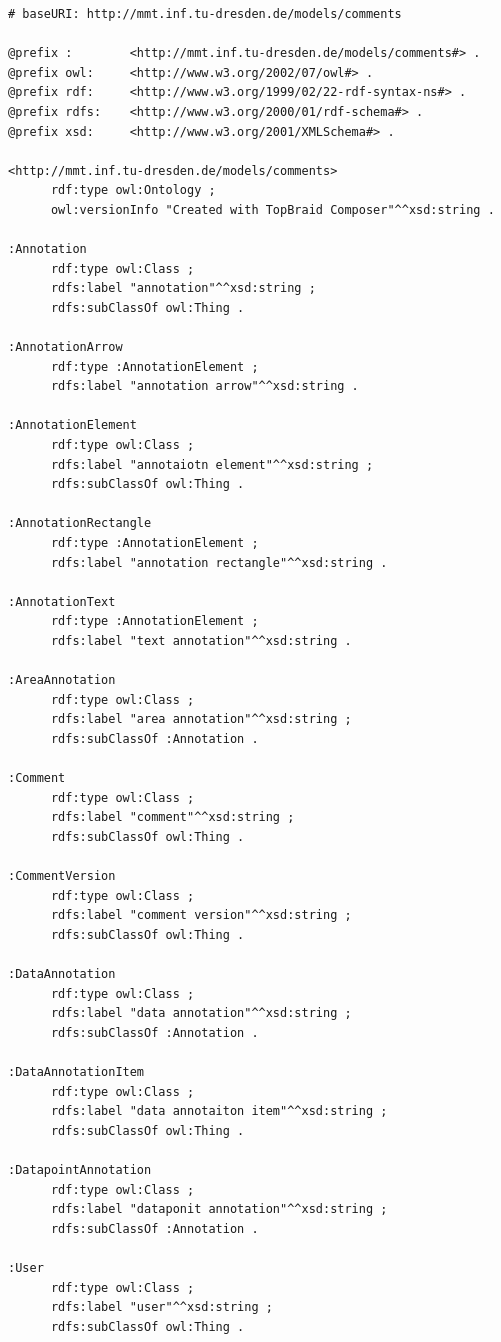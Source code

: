 \documentclass[
	headsepline,
	footsepline,
	fontsize=12pt,
	bibliography=totoc
]{scrbook}
\begin{document}
\begin{lstlisting}[caption={RDF Format eines Kommentars in Turtle}, label=code:implementierung-format-rdf]
# baseURI: http://mmt.inf.tu-dresden.de/models/comments

@prefix :        <http://mmt.inf.tu-dresden.de/models/comments#> .
@prefix owl:     <http://www.w3.org/2002/07/owl#> .
@prefix rdf:     <http://www.w3.org/1999/02/22-rdf-syntax-ns#> .
@prefix rdfs:    <http://www.w3.org/2000/01/rdf-schema#> .
@prefix xsd:     <http://www.w3.org/2001/XMLSchema#> .

<http://mmt.inf.tu-dresden.de/models/comments>
      rdf:type owl:Ontology ;
      owl:versionInfo "Created with TopBraid Composer"^^xsd:string .

:Annotation
      rdf:type owl:Class ;
      rdfs:label "annotation"^^xsd:string ;
      rdfs:subClassOf owl:Thing .

:AnnotationArrow
      rdf:type :AnnotationElement ;
      rdfs:label "annotation arrow"^^xsd:string .

:AnnotationElement
      rdf:type owl:Class ;
      rdfs:label "annotaiotn element"^^xsd:string ;
      rdfs:subClassOf owl:Thing .

:AnnotationRectangle
      rdf:type :AnnotationElement ;
      rdfs:label "annotation rectangle"^^xsd:string .

:AnnotationText
      rdf:type :AnnotationElement ;
      rdfs:label "text annotation"^^xsd:string .

:AreaAnnotation
      rdf:type owl:Class ;
      rdfs:label "area annotation"^^xsd:string ;
      rdfs:subClassOf :Annotation .

:Comment
      rdf:type owl:Class ;
      rdfs:label "comment"^^xsd:string ;
      rdfs:subClassOf owl:Thing .

:CommentVersion
      rdf:type owl:Class ;
      rdfs:label "comment version"^^xsd:string ;
      rdfs:subClassOf owl:Thing .

:DataAnnotation
      rdf:type owl:Class ;
      rdfs:label "data annotation"^^xsd:string ;
      rdfs:subClassOf :Annotation .

:DataAnnotationItem
      rdf:type owl:Class ;
      rdfs:label "data annotaiton item"^^xsd:string ;
      rdfs:subClassOf owl:Thing .

:DatapointAnnotation
      rdf:type owl:Class ;
      rdfs:label "dataponit annotation"^^xsd:string ;
      rdfs:subClassOf :Annotation .

:User
      rdf:type owl:Class ;
      rdfs:label "user"^^xsd:string ;
      rdfs:subClassOf owl:Thing .


\end{lstlisting}
\end{document}
